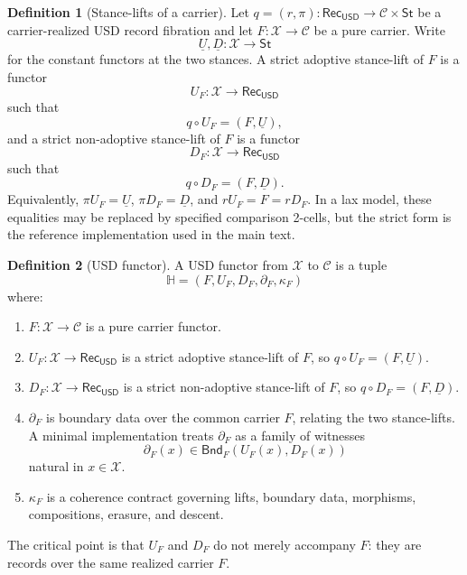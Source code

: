 \documentclass[11pt]{article}
\newcommand{\USD}{\mathsf{USD}}
\newcommand{\RecUSD}{\mathsf{Rec}_{\USD}}
\newcommand{\St}{\mathsf{St}}
\newcommand{\Bnd}{\mathsf{Bnd}}
\theoremstyle{definition}
\newtheorem{definition}{Definition}[section]
\theoremstyle{plain}
\begin{document}
\begin{definition}[Stance-lifts of a carrier]
Let $q=(r,\pi):\RecUSD\to\mathcal C\times\St$ be a carrier-realized USD
record fibration and let $F:\mathcal X\to\mathcal C$ be a pure carrier.
Write
\[
  \underline U,\underline D:\mathcal X\to\St
\]
for the constant functors at the two stances.  A strict adoptive
stance-lift of $F$ is a functor
\[
  U_F:\mathcal X\to\RecUSD
\]
such that
\[
  q\circ U_F=(F,\underline U),
\]
and a strict non-adoptive stance-lift of $F$ is a functor
\[
  D_F:\mathcal X\to\RecUSD
\]
such that
\[
  q\circ D_F=(F,\underline D).
\]
Equivalently, $\pi U_F=\underline U$, $\pi D_F=\underline D$, and
$rU_F=F=rD_F$.  In a lax model, these equalities may be replaced by
specified comparison 2-cells, but the strict form is the reference
implementation used in the main text.
\end{definition}

\begin{definition}[USD functor]
A USD functor from $\mathcal X$ to $\mathcal C$ is a tuple
\[
  \mathbb H=(F,U_F,D_F,\partial_F,\kappa_F)
\]
where:
\begin{enumerate}[label=(\roman*),leftmargin=*]
  \item $F:\mathcal X\to\mathcal C$ is a pure carrier functor.
  \item $U_F:\mathcal X\to\RecUSD$ is a strict adoptive stance-lift of
  $F$, so $q\circ U_F=(F,\underline U)$.
  \item $D_F:\mathcal X\to\RecUSD$ is a strict non-adoptive stance-lift
  of $F$, so $q\circ D_F=(F,\underline D)$.
  \item $\partial_F$ is boundary data over the common carrier $F$,
  relating the two stance-lifts.  A minimal implementation treats
  $\partial_F$ as a family of witnesses
  \[
    \partial_F(x)\in \Bnd_F(U_F(x),D_F(x))
  \]
  natural in $x\in\mathcal X$.
  \item $\kappa_F$ is a coherence contract governing lifts, boundary data,
  morphisms, compositions, erasure, and descent.
\end{enumerate}
The critical point is that $U_F$ and $D_F$ do not merely accompany $F$:
they are records over the same realized carrier $F$.
\end{definition}
\end{document}

